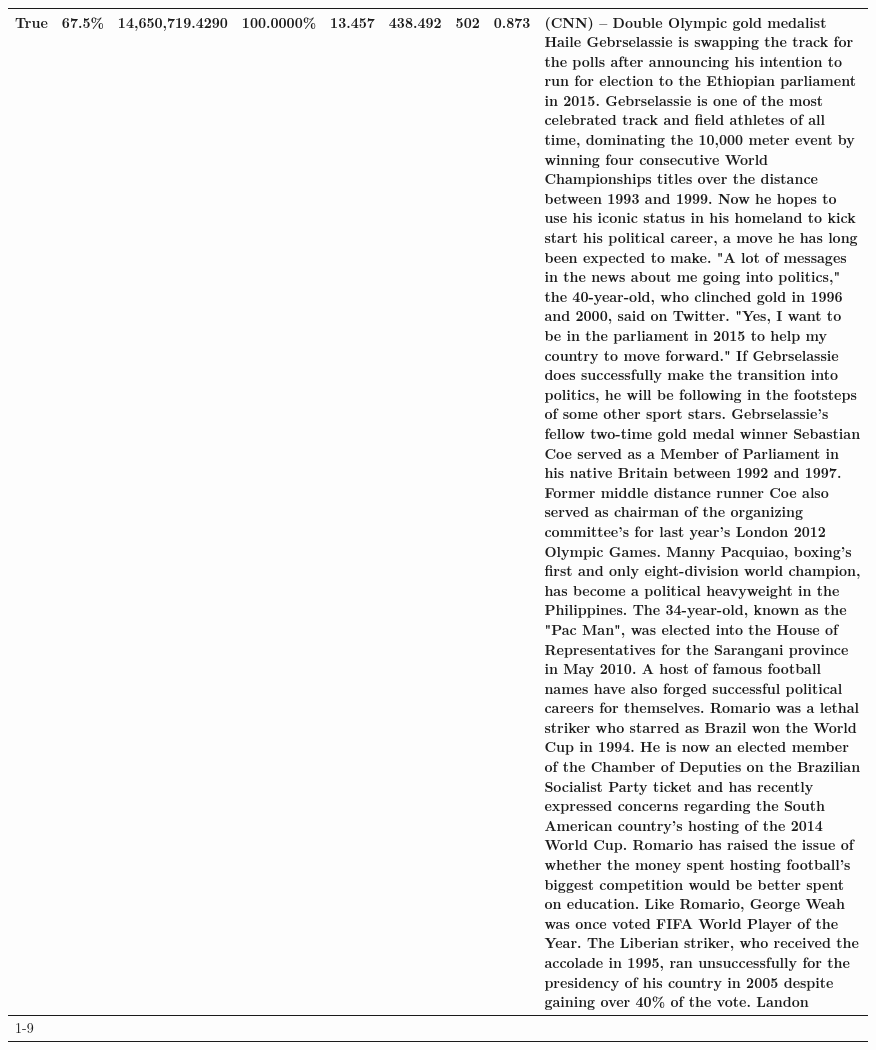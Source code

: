 \begin{table}[H]
{\begin{tabular}{lllrlllll}
True & 67.5\% & 14,650,719.4290 & \bfseries \color{red} 100.0000\% & 13.457 & \bfseries \color{red} 438.492 & 502 & \bfseries \color{red} 0.873 & (CNN) -- Double Olympic gold medalist Haile Gebrselassie is swapping the track for the polls after announcing his intention to run for election to the Ethiopian parliament in 2015. Gebrselassie is one of the most celebrated track and field athletes of all time, dominating the 10,000 meter event by winning four consecutive World Championships titles over the distance between 1993 and 1999. Now he hopes to use his iconic status in his homeland to kick start his political career, a move he has long been expected to make. "A lot of messages in the news about me going into politics," the 40-year-old, who clinched gold in 1996 and 2000, said on Twitter. "Yes, I want to be in the parliament in 2015 to help my country to move forward." If Gebrselassie does successfully make the transition into politics, he will be following in the footsteps of some other sport stars. Gebrselassie's fellow two-time gold medal winner Sebastian Coe served as a Member of Parliament in his native Britain between 1992 and 1997. Former middle distance runner Coe also served as chairman of the organizing committee's for last year's London 2012 Olympic Games. Manny Pacquiao, boxing's first and only eight-division world champion, has become a political heavyweight in the Philippines. The 34-year-old, known as the "Pac Man", was elected into the House of Representatives for the Sarangani province in May 2010. A host of famous football names have also forged successful political careers for themselves. Romario was a lethal striker who starred as Brazil won the World Cup in 1994. He is now an elected member of the Chamber of Deputies on the Brazilian Socialist Party ticket and has recently expressed concerns regarding the South American country's hosting of the 2014 World Cup. Romario has raised the issue of whether the money spent hosting football's biggest competition would be better spent on education. Like Romario, George Weah was once voted FIFA World Player of the Year. The Liberian striker, who received the accolade in 1995, ran unsuccessfully for the presidency of his country in 2005 despite gaining over 40\% of the vote. Landon \\
\cline{1-9}

\end{tabular}}
\end{table}
